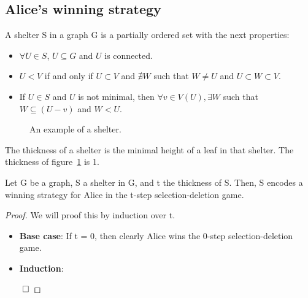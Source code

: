 \subsection{Alice's winning strategy}
\begin{definition}
A shelter S in a graph G is a partially ordered set with the next properties:
\begin{itemize}
  \item $\forall U \in S$, $U \subseteq G$ and $U$ is connected.
  \item $U < V$ if and only if $U \subset V$ and $\nexists W$ such that $W \neq U$ and $U \subset W \subset V$.
  \item If $U \in S$ and $U$ is not minimal, then $\forall v \in V(U), \exists W$ such that $W \subseteq (U-v)$ and $W < U$.
\end{itemize}
\end{definition}

\begin{figure}[H]

\caption{An example of a shelter. \label{fig:shelter-example}}
\end{figure}
The thickness of a shelter is the minimal height of a leaf in that shelter. The thickness of figure~\ref{fig:shelter-example} is 1.
\begin{lemma}
Let G be a graph, S a shelter in G, and t the thickness of S. Then, S encodes a winning strategy for Alice in the t-step selection-deletion game.
\end{lemma}
\begin{proof}
We will proof this by induction over t.
\begin{itemize}
  \item \textbf{Base case}: If t = 0, then clearly Alice wins the 0-step selection-deletion game.
  \item \textbf{Induction}: 
\end{itemize}
$\qed$
\end{proof}